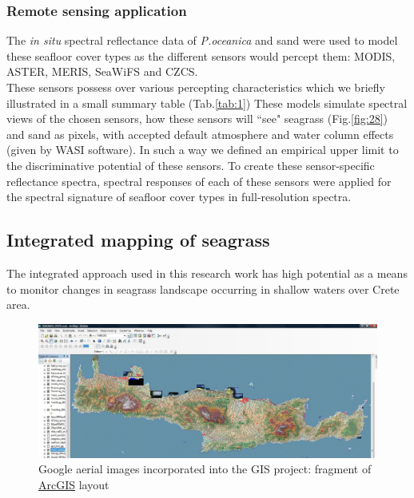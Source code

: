 \documentclass[11pt]{article}
\begin{document}
\subsubsection{Remote sensing application}
The \textit{in situ} spectral reflectance data of \textit{P.oceanica} and sand were used to model these seafloor cover
types as the different sensors would percept them: \ac{MODIS}, \ac{ASTER}, \ac{MERIS}, \ac{SeaWiFS} and \ac{CZCS}.\\
These sensors possess over various percepting characteristics which we briefly illustrated in a small summary table (Tab.\ref{tab:1})
These models simulate spectral views of the chosen sensors, how these sensors will ``see" seagrass (Fig.\ref{fig:28}) and sand as
pixels, with accepted default atmosphere and water column effects (given by \ac{WASI} software). In such
a way we defined an empirical upper limit to the discriminative potential of these sensors. To create
these sensor-specific reflectance spectra, spectral responses of each of these sensors were applied for
the spectral signature of seafloor cover types in full-resolution spectra.

\subsection{Integrated mapping of seagrass}

The integrated approach used in this research work has high potential as a means to monitor changes
in seagrass landscape occurring in shallow waters over Crete area.

\begin{figure}
	\begin{center}
		\includegraphics[scale=0.25]{Fig-37.jpg}
		\caption{Google aerial images incorporated into the GIS project: fragment of \href{http://www.esri.com/software/arcgis/index.html}{ArcGIS} layout}
		\label{fig:4.17}
	\end{center}
\end{figure}
\end{document}
